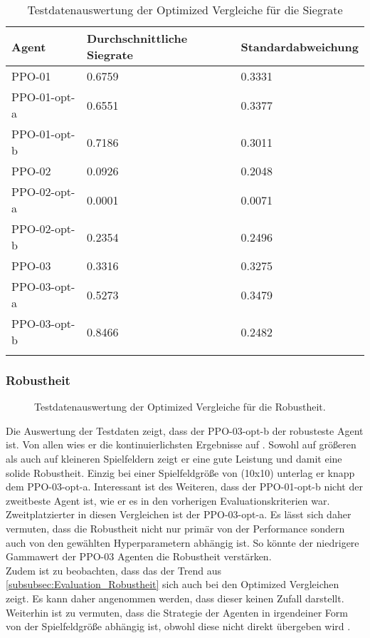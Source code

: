 \begin{longtable}[h]{|p{4.5cm}|p{4.5cm}|p{4.5cm}|}
	\hline
	Agent & Durchschnittliche Siegrate & Standardabweichung \\
	\hline
	PPO-01 & 0.6759 & 0.3331 \\ 
	\hline
	PPO-01-opt-a & 0.6551 & 0.3377 \\ 
	\hline
	PPO-01-opt-b & 0.7186 & 0.3011 \\ 
	\hline
	PPO-02 & 0.0926 & 0.2048 \\ 
	\hline
	PPO-02-opt-a & 0.0001 & 0.0071 \\ 
	\hline
	PPO-02-opt-b & 0.2354 & 0.2496 \\ 
	\hline
	PPO-03 & 0.3316 & 0.3275 \\ 
	\hline
	PPO-03-opt-a & 0.5273 & 0.3479 \\ 
	\hline
	PPO-03-opt-b & 0.8466 & 0.2482 \\ 
	\hline
	\caption{Testdatenauswertung der Optimized Vergleiche für die Siegrate}
	\label{tab:Evaluation_Testdaten_Winrate_Optimized} 
\end{longtable}

\subsubsection{Robustheit}
\begin{figure}[H]
	\centering
	
	\caption[Robustheit - Auswertung der Testdaten der Optimized Vergleiche]{Testdatenauswertung der Optimized Vergleiche für die Robustheit.}
	\label{fig:Evaluation_Robustheit_Optimized}
\end{figure}
Die Auswertung der Testdaten zeigt, dass der PPO-03-opt-b der robusteste Agent ist.
Von allen wies er die kontinuierlichsten Ergebnisse auf . Sowohl auf größeren als auch auf kleineren Spielfeldern zeigt er eine gute Leistung und damit eine solide Robustheit. 
Einzig bei einer Spielfeldgröße von (10x10) unterlag er knapp dem PPO-03-opt-a.
Interessant ist des Weiteren, dass der PPO-01-opt-b nicht der zweitbeste Agent ist, wie er es in den vorherigen Evaluationskriterien war. Zweitplatzierter in diesen Vergleichen ist der PPO-03-opt-a. Es lässt sich daher vermuten, dass die Robustheit nicht nur primär von der Performance sondern auch von den gewählten Hyperparametern abhängig ist. So könnte der niedrigere Gammawert der PPO-03 Agenten die Robustheit verstärken.\\
Zudem ist zu beobachten, dass das der Trend aus \autoref{subsubsec:Evaluation_Robustheit} sich auch bei den Optimized Vergleichen zeigt. Es kann daher angenommen werden, dass dieser keinen Zufall darstellt.
Weiterhin ist zu vermuten, dass die Strategie der Agenten in irgendeiner Form von der Spielfeldgröße abhängig ist, obwohl diese nicht direkt übergeben wird .

